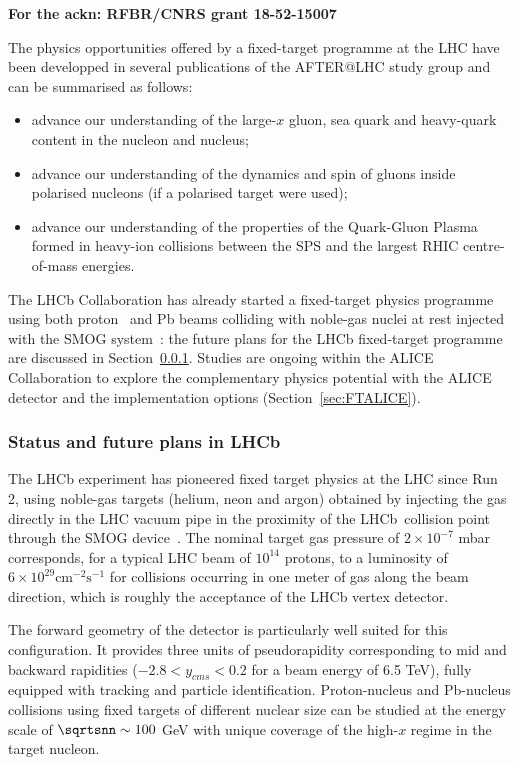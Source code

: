 \documentclass[../report.tex]{subfiles}
\begin{document}
{\bf For the ackn: RFBR/CNRS grant 18-52-15007}

The physics opportunities offered by a fixed-target programme at the LHC have been developped in several publications of the AFTER@LHC study group \cite{Brodsky:2012vg, Lansberg:Adv2015} and can be summarised as follows:
\begin{itemize}
\item advance our understanding of the large-$x$ gluon, sea quark and heavy-quark content in the nucleon and nucleus;
\item advance our understanding of the dynamics and spin of gluons inside polarised nucleons (if a polarised target were used);
\item advance our understanding of the properties of the Quark-Gluon Plasma formed in heavy-ion collisions between the SPS and the largest RHIC centre-of-mass energies.
\end{itemize}
The LHCb Collaboration has already started a fixed-target physics programme using both proton~\cite{Aaij:2018svt,Aaij:2018ogq} and Pb beams colliding with noble-gas nuclei at rest injected with the SMOG system~\cite{SMOG}: the future plans for the LHCb fixed-target programme are discussed in Section~\ref{sec:FTLHCb}. Studies are ongoing within the ALICE Collaboration to explore the complementary physics potential with the ALICE detector and the implementation options (Section~\ref{sec:FTALICE}). 

\subsubsection{Status and future plans in LHCb}
\label{sec:FTLHCb}


The LHCb experiment has pioneered fixed target physics at the LHC since Run 2, 
using noble-gas targets (helium, neon and argon) obtained by injecting the gas directly in 
the LHC vacuum pipe in the proximity of the LHCb~collision point
through the SMOG device~\cite{smog}.
The nominal target gas pressure of $2 \times 10^{-7}$ mbar corresponds,
for a typical LHC beam of $10^{14}$ protons, to a luminosity of 
$6 \times 10^{29} \text{cm}^{-2}\text{s}^{-1}$ for collisions occurring in one
meter of gas along the beam direction, which is roughly the acceptance of the
LHCb vertex detector.

The forward geometry of the detector is particularly well suited for
this configuration.  It provides three units
of pseudorapidity corresponding to mid and backward rapidities ($-2.8 < y_{cms}< 0.2$
for a beam energy of 6.5 TeV), fully equipped with tracking and particle identification. 
Proton-nucleus and Pb-nucleus collisions using fixed targets of different
nuclear size can be studied at the energy scale of $\sqrtsnn \sim 100$
GeV with unique coverage of the high-$x$ regime in the target nucleon.
\end{document}
